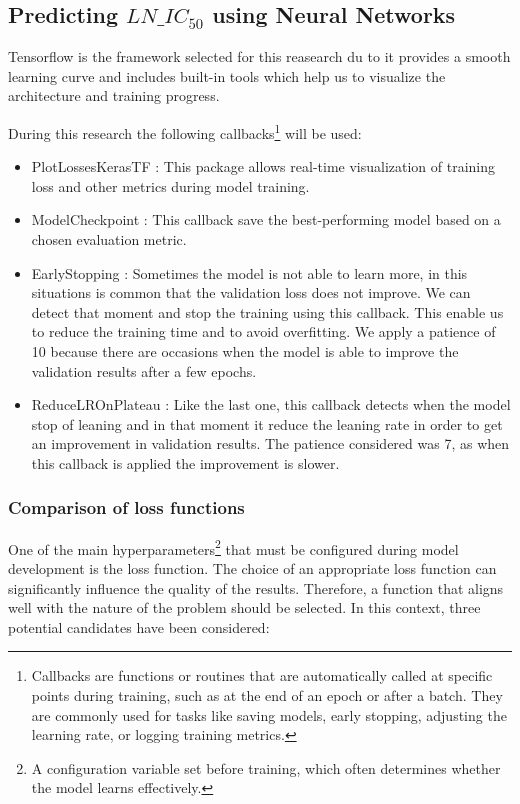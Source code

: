 \subsection{Predicting $LN\_IC_{50}$ using Neural Networks}

Tensorflow is the framework selected for this reasearch du to it provides a smooth learning curve and includes built-in tools which help us to visualize the architecture and training progress.

During this research the following callbacks\footnote{Callbacks are functions or routines that are automatically called at specific points during training, such as at the end of an epoch or after a batch. They are commonly used for tasks like saving models, early stopping, adjusting the learning rate, or logging training metrics.} will be used:
\begin{itemize}
    \item PlotLossesKerasTF \cite{livelossplot}: This package allows real-time visualization of training loss and other metrics during model training.
    \item ModelCheckpoint \cite{modelcheckpoint}: This callback save the best-performing model based on a chosen evaluation metric.
    \item EarlyStopping \cite{earlystopping}: Sometimes the model is not able to learn more, in this situations is common that the validation loss does not improve. We can detect that moment and stop the training using this callback. This enable us to reduce the training time and to avoid overfitting. We apply a patience of 10 because there are occasions when the model is able to improve the validation results after a few epochs.
    \item ReduceLROnPlateau \cite{reducelronplateau}: Like the last one, this callback detects when the model stop of leaning and in that moment it reduce the leaning rate in order to get an improvement in validation results. The patience considered was 7, as when this callback is applied the improvement is slower.
\end{itemize}



\subsubsection{Comparison of loss functions}

One of the main hyperparameters\footnote{A configuration variable set before training, which often determines whether the model learns effectively.} that must be configured during model development is the loss function. The choice of an appropriate loss function can significantly influence the quality of the results. Therefore, a function that aligns well with the nature of the problem should be selected. In this context, three potential candidates have been considered:

